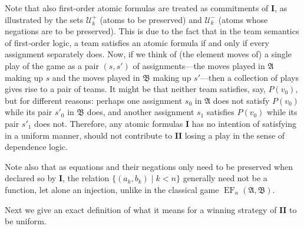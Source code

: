 \documentclass[10pt,a4paper]{amsart}
\newcommand{\playerone}{\mathrm{\mathbf{I}}}
\newcommand{\playertwo}{\mathrm{\mathbf{II}}}
\DeclareMathOperator{\EF}{EF}
\newcommand{\U}{\mathcal U}
\newcommand{\A}{\mathfrak{A}}
\newcommand{\B}{\mathfrak{B}}
\begin{document}
Note that also first-order atomic formulas are treated as commitments of $\playerone$, as illustrated by the sets $\U^+_k$ (atoms to be preserved) and $\U^-_k$ (atoms whose negations are to be preserved). This is due to the fact that in the team semantics of first-order logic, a team satisfies an atomic formula if and only if every assignment separately does. Now, if we think of (the element moves of) a single play of the game as a pair $(s,s')$ of assignments---the moves played in $\A$ making up $s$ and the moves played in $\B$ making up $s'$---then a collection of plays gives rise to a pair of teams. It might be that neither team satisfies, say, $P(v_0)$, but for different reasons: perhaps one assignment $s_0$ in $\A$ does not satisfy $P(v_0)$ while its pair $s'_0$ in $\B$ does, and another assignment $s_1$ satisfies $P(v_0)$ while its pair $s'_1$ does not. Therefore, any atomic formulas $\playerone$ has no intention of satisfying in a uniform manner, should not contribute to $\playertwo$ losing a play in the sense of dependence logic.

Note also that as equations and their negations only need to be preserved when declared so by $\playerone$, the relation $\{ (a_k, b_k) \mid k<n \}$ generally need not be a function, let alone an injection, unlike in the classical game $\EF_n(\A,\B)$.

Next we give an exact definition of what it means for a winning strategy of $\playertwo$ to be uniform.
\end{document}
